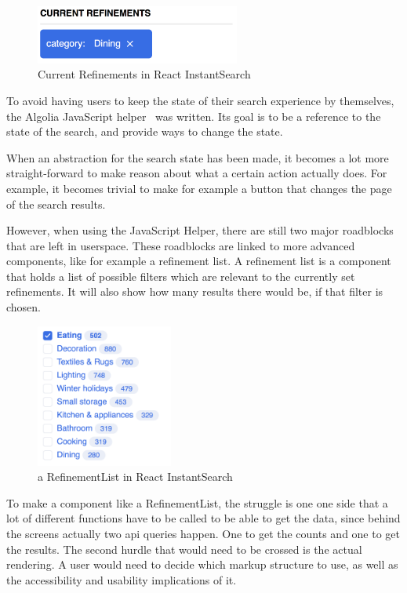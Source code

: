 \begin{figure}[H]
  \centering
  \includegraphics[width=0.6\textwidth]{../assets/current-refinements.png}
  \caption{Current Refinements in React InstantSearch\cite{ris-storybooks}}
  \label{figure:current-refinements}
\end{figure}

To avoid having users to keep the state of their search experience by themselves, the Algolia JavaScript helper~\cite{algolia-js-helper} was written. Its goal is to be a reference to the state of the search, and provide ways to change the state.

When an abstraction for the search state has been made, it becomes a lot more straight-forward to make reason about what a certain action actually does. For example, it becomes trivial to make for example a button that changes the page of the search results.

However, when using the JavaScript Helper, there are still two major roadblocks that are left in \gls{userspace}. These roadblocks are linked to more advanced components, like for example a refinement list. A refinement list is a component that holds a list of possible filters which are relevant to the currently set refinements. It will also show how many results there would be, if that filter is chosen.

\begin{figure}[H]
  \centering
  \includegraphics[width=0.4\textwidth]{../assets/refinementlist.png}
  \caption{a RefinementList in React InstantSearch\cite{ris-storybooks}}
  \label{figure:refinementlist-ris}
\end{figure}

To make a component like a RefinementList, the struggle is one one side that a lot of different functions have to be called to be able to get the data, since behind the screens actually two \acrshort{api} queries happen. One to get the counts and one to get the results. The second hurdle that would need to be crossed is the actual rendering. A user would need to decide which markup structure to use, as well as the accessibility and usability implications of it.

